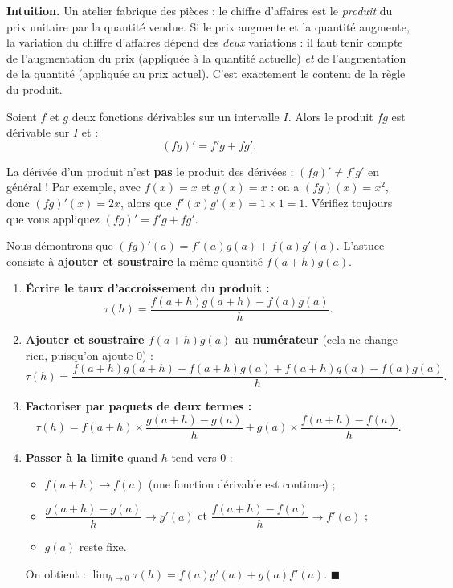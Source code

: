 \documentclass[11pt]{article}
\newcounter{popsec}
\newcounter{popsub}
\newcommand{\courssub}[1]{%
  \stepcounter{popsub}%
  \par\vspace{9pt}\noindent{\popxbold\fontsize{11.5}{13}\selectfont\color{popink}{\color{poporange}\thepopsec.\thepopsub}\hspace{6pt}#1}\par\nopagebreak\vspace{4pt}
}
\begin{document}
\courssub{Règle du produit}

\textbf{Intuition.} Un atelier fabrique des pièces : le chiffre d'affaires est le \emph{produit} du prix unitaire par la quantité vendue. Si le prix augmente et la quantité augmente, la variation du chiffre d'affaires dépend des \emph{deux} variations : il faut tenir compte de l'augmentation du prix (appliquée à la quantité actuelle) \emph{et} de l'augmentation de la quantité (appliquée au prix actuel). C'est exactement le contenu de la règle du produit.

\begin{propriete}
Soient $f$ et $g$ deux fonctions dérivables sur un intervalle $I$. Alors le produit $fg$ est dérivable sur $I$ et :
\[ (fg)' = f'g + fg'. \]
\end{propriete}

\begin{attention}
La dérivée d'un produit n'est \textbf{pas} le produit des dérivées : $(fg)' \neq f'g'$ en général ! Par exemple, avec $f(x) = x$ et $g(x) = x$ : on a $(fg)(x) = x^2$, donc $(fg)'(x) = 2x$, alors que $f'(x)g'(x) = 1 \times 1 = 1$. Vérifiez toujours que vous appliquez $(fg)' = f'g + fg'$.
\end{attention}

\begin{experience}
Nous démontrons que $(fg)'(a) = f'(a)g(a) + f(a)g'(a)$. L'astuce consiste à \textbf{ajouter et soustraire} la même quantité $f(a+h)g(a)$.

\begin{enumerate}
\item \textbf{Écrire le taux d'accroissement du produit :}
\[ \tau(h) = \frac{f(a+h)g(a+h) - f(a)g(a)}{h}. \]
\item \textbf{Ajouter et soustraire $f(a+h)g(a)$ au numérateur} (cela ne change rien, puisqu'on ajoute $0$) :
\[ \tau(h) = \frac{f(a+h)g(a+h) - f(a+h)g(a) + f(a+h)g(a) - f(a)g(a)}{h}. \]
\item \textbf{Factoriser par paquets de deux termes :}
\[ \tau(h) = f(a+h) \times \frac{g(a+h) - g(a)}{h} + g(a) \times \frac{f(a+h) - f(a)}{h}. \]
\item \textbf{Passer à la limite} quand $h$ tend vers $0$ :
\begin{itemize}
\item $f(a+h) \to f(a)$ (une fonction dérivable est continue) ;
\item $\dfrac{g(a+h)-g(a)}{h} \to g'(a)$ et $\dfrac{f(a+h)-f(a)}{h} \to f'(a)$ ;
\item $g(a)$ reste fixe.
\end{itemize}
On obtient : $\displaystyle\lim_{h \to 0} \tau(h) = f(a)g'(a) + g(a)f'(a)$. \hfill $\blacksquare$
\end{enumerate}
\end{experience}
\end{document}
